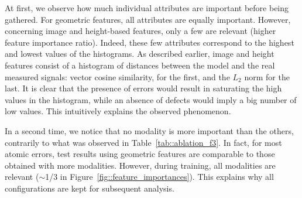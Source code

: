             \begin{figure}[htpb]
                \centering
            \end{figure}
            
            At first, we observe how much individual attributes are important before being gathered.
            For geometric features, all attributes are equally important.
            However, concerning image and height-based features, only a few are relevant (higher feature importance ratio).
            Indeed, these few attributes correspond to the highest and lowest values of the histograms.
            As described earlier, image and height features consist of a histogram of distances between the model and the real measured signals:
            vector cosine similarity, for the first, and the \(L_2\) norm for the last.
            It is clear that the presence of errors would result in saturating the high values in the histogram, while an absence of defects would imply a big number of low values.
            This intuitively explains the observed phenomenon.
            
            In a second time, we notice that no modality is more important than the others, contrarily to what was observed in Table~\ref{tab::ablation_f3}.
            In fact, for most atomic errors, test results using geometric features are comparable to those obtained with more modalities.
            However, during training, all modalities are relevant ($\sim$1/3 in Figure~\ref{fig::feature_importances}).
            This explains why all configurations are kept for subsequent analysis.
